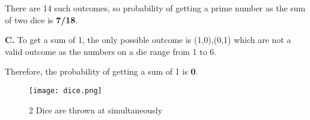 \documentclass{IEEEtran}
\begin{document}
\bigskip

There are 14 such outcomes, so probability of getting a prime number as the sum of two dice is \textbf{7/18}.

\bigskip

\textbf{C.}
To get a sum of 1, the only possible outcome is (1,0),(0,1) which are not a valid outcome as the numbers on a die range from 1 to 6. \newline

\bigskip

Therefore, the probability of getting a sum of 1 is \textbf{0}.


\begin{figure}[!ht]
    \center
    \texttt{[image: dice.png]}
    \caption{\label{schema}2 Dice are thrown at simultaneously}
  \end{figure}



		

\end{document}
